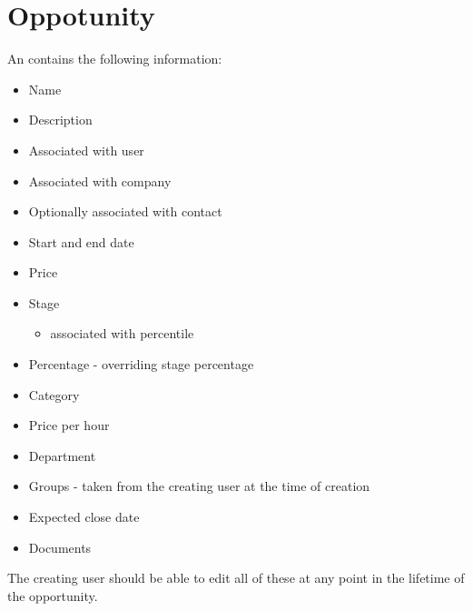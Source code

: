 \chapter{Oppotunity}
\label{app:Oppotunity}

An contains the following information:
\begin{itemize}
  \item Name
  \item Description
  \item Associated with user
  \item Associated with company
  \item Optionally associated with contact
  \item Start and end date
  \item Price
  \item Stage
  \begin{itemize}
    \item associated with percentile
  \end{itemize}
  \item Percentage - overriding stage percentage
  \item Category
  \item Price per hour
  \item Department
  \item Groups - taken from the creating user at the time of creation
  \item Expected close date
  \item Documents
\end{itemize}
The creating user should be able to edit all of these at any point in the lifetime of the opportunity.
